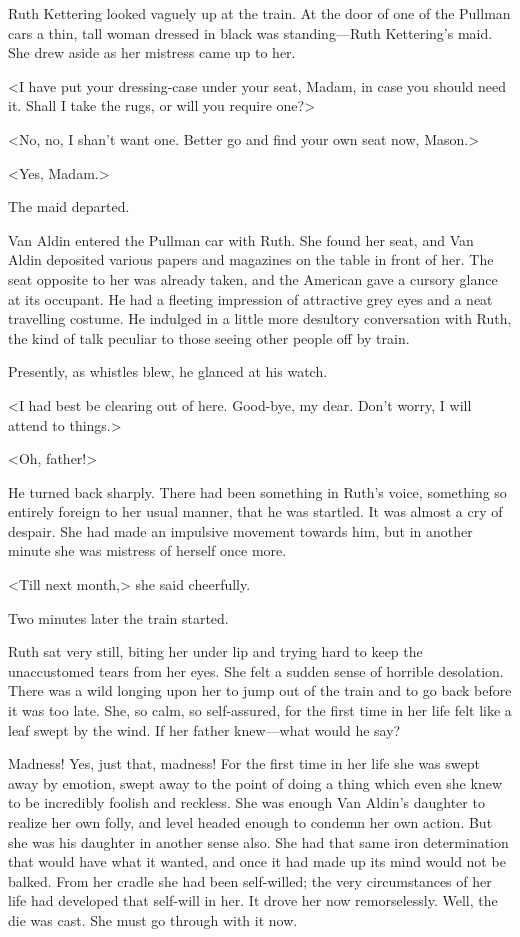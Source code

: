 Ruth Kettering looked vaguely up at the train. At the door of one of the Pullman cars a thin, tall woman dressed in black was standing—Ruth Kettering's maid. She drew aside as her mistress came up to her.

<I have put your dressing-case under your seat, Madam, in case you should need it. Shall I take the rugs, or will you require one?>

<No, no, I shan't want one. Better go and find your own seat now, Mason.>

<Yes, Madam.>

The maid departed.

Van Aldin entered the Pullman car with Ruth. She found her seat, and Van Aldin deposited various papers and magazines on the table in front of her. The seat opposite to her was already taken, and the American gave a cursory glance at its occupant. He had a fleeting impression of attractive grey eyes and a neat travelling costume. He indulged in a little more desultory conversation with Ruth, the kind of talk peculiar to those seeing other people off by train.

Presently, as whistles blew, he glanced at his watch.

<I had best be clearing out of here. Good-bye, my dear. Don't worry, I will attend to things.>

<Oh, father!>

He turned back sharply. There had been something in Ruth's voice, something so entirely foreign to her usual manner, that he was startled. It was almost a cry of despair. She had made an impulsive movement towards him, but in another minute she was mistress of herself once more.

<Till next month,> she said cheerfully.

Two minutes later the train started.

Ruth sat very still, biting her under lip and trying hard to keep the unaccustomed tears from her eyes. She felt a sudden sense of horrible desolation. There was a wild longing upon her to jump out of the train and to go back before it was too late. She, so calm, so self-assured, for the first time in her life felt like a leaf swept by the wind. If her father knew—what would he say?

Madness! Yes, just that, madness! For the first time in her life she was swept away by emotion, swept away to the point of doing a thing which even she knew to be incredibly foolish and reckless. She was enough Van Aldin's daughter to realize her own folly, and level headed enough to condemn her own action. But she was his daughter in another sense also. She had that same iron determination that would have what it wanted, and once it had made up its mind would not be balked. From her cradle she had been self-willed; the very circumstances of her life had developed that self-will in her. It drove her now remorselessly. Well, the die was cast. She must go through with it now.


